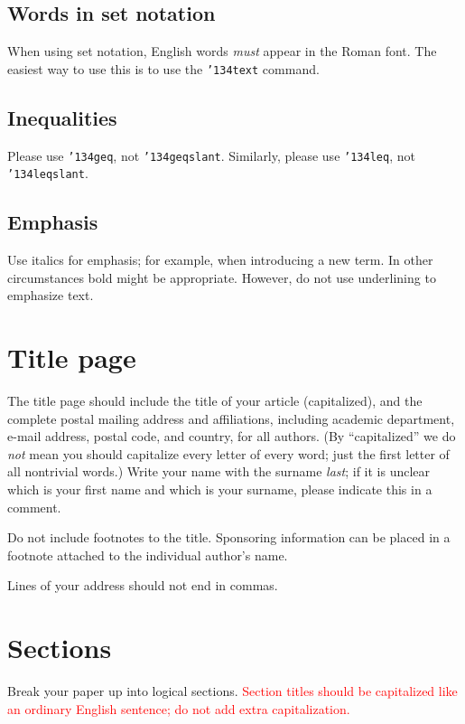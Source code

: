\documentclass[12pt]{article}
\begin{document}
\subsection{Words in set notation}

When using set notation, English words 
{\it must\/} appear in the Roman font.
The easiest way to use this is to use the {\tt \char'134text} command.

\subsection{Inequalities}

Please use {\tt \char'134geq}, not {\tt \char'134geqslant}.  Similarly,
please use {\tt \char'134leq}, not {\tt \char'134leqslant}.

\subsection{Emphasis}
Use italics for emphasis; for example, when introducing a new term.
In other circumstances bold might be appropriate.  However, do not use
underlining to emphasize text.

\section{Title page}

The title page should include the title of your article (capitalized),
and the complete postal mailing address and affiliations, including academic
department, e-mail address, postal code, and country,
for all authors.    
(By ``capitalized'' we do {\it not\/} mean you should capitalize every letter
of every word; just the first letter of all nontrivial words.)
Write your name with the surname {\it last}; if it is
unclear which is your first name and which is your surname, please
indicate this in a comment.

Do not include footnotes to the title.  Sponsoring information can be
placed in a footnote attached to the individual author's name.

Lines of your address should not end in commas.

\section{Sections}

Break your paper up into logical sections.  
\textcolor{red}{Section titles should
be capitalized like an ordinary English sentence; do not add extra
capitalization.}
\end{document}
